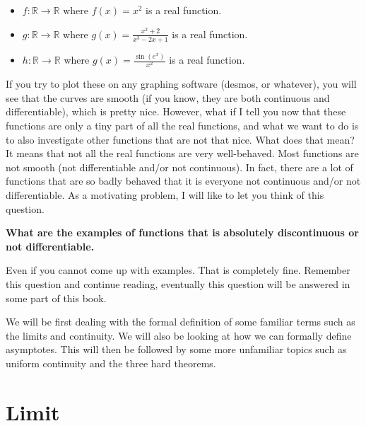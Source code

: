 \documentclass{book}
\begin{document}
\begin{itemize}
    \item $f : \mathbb{R} \rightarrow \mathbb{R}$ where $f(x) = x^{2}$ is a real function.
    \item $g : \mathbb{R} \rightarrow \mathbb{R}$ where $g(x) = \frac{x^{2} + 2}{x^{3} - 2x + 1}$ is a real function.
    \item $h : \mathbb{R} \rightarrow \mathbb{R}$ where $g(x) = \frac{\sin(e^{x})}{x^{2}}$ is a real function.
\end{itemize}

If you try to plot these on any graphing software (desmos, or whatever), you will see that the curves are smooth (if you know, they are both continuous and differentiable), which is pretty nice. However, what if I tell you now that these functions are only a tiny part of all the real functions, and what we want to do is to also investigate other functions that are not that nice. What does that mean? It means that not all the real functions are very well-behaved. Most functions are not smooth (not differentiable and/or not continuous). In fact, there are a lot of functions that are so badly behaved that it is everyone not continuous and/or not differentiable. As a motivating problem, I will like to let you think of this question.

{\centering \textbf{What are the examples of functions that is absolutely discontinuous or not differentiable.}}

Even if you cannot come up with examples. That is completely fine. Remember this question and continue reading, eventually this question will be answered in some part of this book.

We will be first dealing with the formal definition of some familiar terms such as the limits and continuity. We will also be looking at how we can formally define asymptotes. This will then be followed by some more unfamiliar topics such as uniform continuity and the three hard theorems.


\section{Limit}
\end{document}
